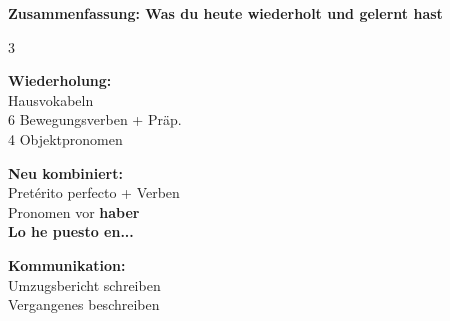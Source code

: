 \documentclass[11pt, a4paper]{article}
\newcommand{\seriftext}[1]{{\fontfamily{ppl}\selectfont #1}}
\newcommand{\es}[1]{\seriftext{\textbf{#1}}}
\begin{document}
\begin{merkbox}
\textbf{Zusammenfassung: Was du heute wiederholt und gelernt hast}

\vspace{4pt}

\begin{multicols}{3}
{\footnotesize

\textbf{Wiederholung:}\\
Hausvokabeln\\
6 Bewegungsverben + Präp.\\
4 Objektpronomen

\columnbreak

\textbf{Neu kombiniert:}\\
Pretérito perfecto + Verben\\
Pronomen vor \es{haber}\\
\es{Lo he puesto en...}

\columnbreak

\textbf{Kommunikation:}\\
Umzugsbericht schreiben\\
Vergangenes beschreiben

}
\end{multicols}
\end{merkbox}
\end{document}

